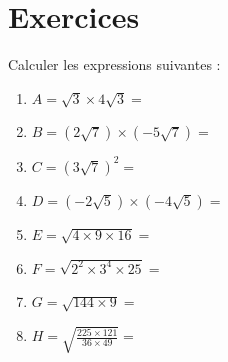 \documentclass[10pt,a4paper,openany,twoside, eleve]{book}
\begin{document}
\chapnumber{} %
\entetegal{}


\setcounter{section}{1}
\section*{Exercices}
\begin{exercicesnofoot}
	\begin{exo}
		Calculer les expressions suivantes :
			\begin{enumerate}[label={}]
				\item $A = \sqrt{3} \times 4\sqrt{3}=$
				\item $B = \left(2\sqrt{7}\right)\times\left(-5\sqrt{7}\right)=$
				\item $C = \left(3\sqrt{7}\right)^2=$
				\item $D = \left(-2\sqrt{5}\right)\times\left(-4\sqrt{5}\right)=$
				\item $E = \sqrt{4\times 9\times 16}=$
				\item $F = \sqrt{2^2\times 3^4\times 25}=$
				\item $G = \sqrt{144\times 9}=$
				\item $H = \sqrt{\frac{225\times 121}{36 \times 49}}=$
			\end{enumerate}
	\end{exo}


\end{exercicesnofoot}
\end{document}
